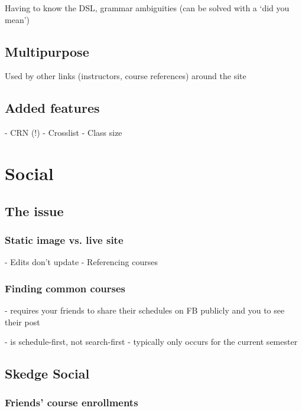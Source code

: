   Having to know the DSL, grammar ambiguities (can be solved with a `did you mean')

\subsection{Multipurpose}

Used by other links (instructors, course references) around the site

\subsection{Added features}

- CRN (!)
- Crosslist
- Class size


\section{Social}

\subsection{The issue}

  \subsubsection{Static image vs. live site}

  - Edits don’t update
  - Referencing courses

  \subsubsection{Finding common courses}

  - requires your friends to share their schedules on FB publicly and you to see their post




  - is schedule-first, not search-first
  - typically only occurs for the current semester


\subsection{Skedge Social}


  \subsubsection{Friends' course enrollments}

